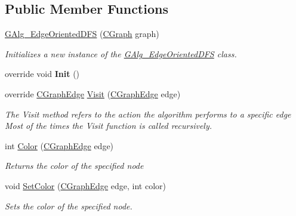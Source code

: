 \subsection*{Public Member Functions}
\begin{DoxyCompactItemize}
\item 
\hyperlink{class_graph_library_1_1_aglorithms_1_1_g_alg___edge_oriented_d_f_s_ab154db21f7f5f64ec4d2899925a6c3bb}{G\+Alg\+\_\+\+Edge\+Oriented\+D\+F\+S} (\hyperlink{class_graph_library_1_1_c_graph}{C\+Graph} graph)
\begin{DoxyCompactList}\small\item\em Initializes a new instance of the \hyperlink{class_graph_library_1_1_aglorithms_1_1_g_alg___edge_oriented_d_f_s}{G\+Alg\+\_\+\+Edge\+Oriented\+D\+F\+S} class. \end{DoxyCompactList}\item 
\hypertarget{class_graph_library_1_1_aglorithms_1_1_g_alg___edge_oriented_d_f_s_aa0b0c46c857d02f7f93dc47ab8df7b5a}{}override void {\bfseries Init} ()\label{class_graph_library_1_1_aglorithms_1_1_g_alg___edge_oriented_d_f_s_aa0b0c46c857d02f7f93dc47ab8df7b5a}

\item 
override \hyperlink{class_graph_library_1_1_c_graph_edge}{C\+Graph\+Edge} \hyperlink{class_graph_library_1_1_aglorithms_1_1_g_alg___edge_oriented_d_f_s_ad46d1eec3b67f4fcd6ecdc02fb44603a}{Visit} (\hyperlink{class_graph_library_1_1_c_graph_edge}{C\+Graph\+Edge} edge)
\begin{DoxyCompactList}\small\item\em The Visit method refers to the action the algorithm performs to a specific edge Most of the times the Visit function is called recursively. \end{DoxyCompactList}\item 
int \hyperlink{class_graph_library_1_1_aglorithms_1_1_g_alg___edge_oriented_d_f_s_a99f99cba172890de22281af8c448fc1c}{Color} (\hyperlink{class_graph_library_1_1_c_graph_edge}{C\+Graph\+Edge} edge)
\begin{DoxyCompactList}\small\item\em Returns the color of the specified node \end{DoxyCompactList}\item 
void \hyperlink{class_graph_library_1_1_aglorithms_1_1_g_alg___edge_oriented_d_f_s_aeb59734bfbf42cdc8502e5b111d0a5b5}{Set\+Color} (\hyperlink{class_graph_library_1_1_c_graph_edge}{C\+Graph\+Edge} edge, int color)
\begin{DoxyCompactList}\small\item\em Sets the color of the specified node. \end{DoxyCompactList}\end{DoxyCompactItemize}

